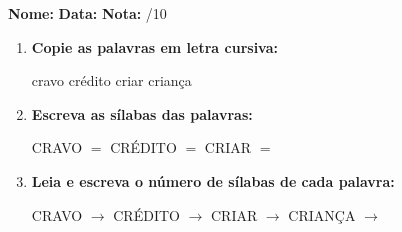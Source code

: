 \begin{exercicio}



\noindent\textbf{Nome:} \underline{\hspace{3.2cm}} \quad \textbf{Data:} \underline{\hspace{1.6cm}} \quad \textbf{Nota:} \underline{\hspace{0.9cm}}/10


\begin{enumerate}

  \item \textbf{Copie as palavras em letra cursiva:}
  \begin{center}
  cravo \quad crédito \quad criar \quad criança
  \end{center}
  \begin{center}
  \underline{\hspace{2.4cm}} \quad \underline{\hspace{2.4cm}} \quad \underline{\hspace{2.4cm}} \quad \underline{\hspace{2.4cm}}
  \end{center}

  \item \textbf{Escreva as sílabas das palavras:}
  \begin{center}
  CRAVO $=$ \underline{\hspace{1.5cm}} \underline{\hspace{1.5cm}} \quad CRÉDITO $=$ \underline{\hspace{1.5cm}} \underline{\hspace{1.5cm}} \quad CRIAR $=$ \underline{\hspace{1.5cm}} \underline{\hspace{1.5cm}}
  \end{center}

  \item \textbf{Leia e escreva o número de sílabas de cada palavra:}
  \begin{center}
  CRAVO $\rightarrow$ \underline{\hspace{0.9cm}} \quad CRÉDITO $\rightarrow$ \underline{\hspace{0.9cm}} \quad CRIAR $\rightarrow$ \underline{\hspace{0.9cm}} \quad CRIANÇA $\rightarrow$ \underline{\hspace{0.9cm}}
  \end{center}


\end{enumerate}
\end{exercicio}

